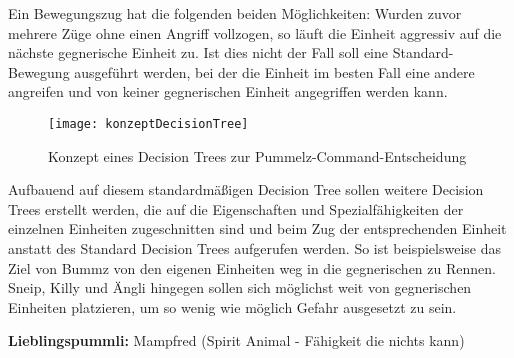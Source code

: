Ein Bewegungszug hat die folgenden beiden Möglichkeiten: Wurden zuvor mehrere Züge ohne einen Angriff vollzogen, so läuft die Einheit aggressiv auf die nächste gegnerische Einheit zu. Ist dies nicht der Fall soll eine Standard-Bewegung ausgeführt werden, bei der die Einheit im besten Fall eine andere angreifen und von keiner gegnerischen Einheit angegriffen werden kann.

\begin{figure}[H]
	\centering
	\texttt{[image: konzeptDecisionTree]}
	\caption{Konzept eines Decision Trees zur Pummelz-Command-Entscheidung}
	\label{fig:konzeptDecisionTree}
\end{figure}

Aufbauend auf diesem standardmäßigen Decision Tree sollen weitere Decision Trees erstellt werden, die auf die Eigenschaften und Spezialfähigkeiten der einzelnen Einheiten zugeschnitten sind und beim Zug der entsprechenden Einheit anstatt des Standard Decision Trees aufgerufen werden. So ist beispielsweise das Ziel von Bummz von den eigenen Einheiten weg in die gegnerischen zu Rennen. Sneip, Killy und Ängli hingegen sollen sich möglichst weit von gegnerischen Einheiten platzieren, um so wenig wie möglich Gefahr ausgesetzt zu sein.

\textbf{Lieblingspummli:} Mampfred (Spirit Animal - Fähigkeit die nichts kann)